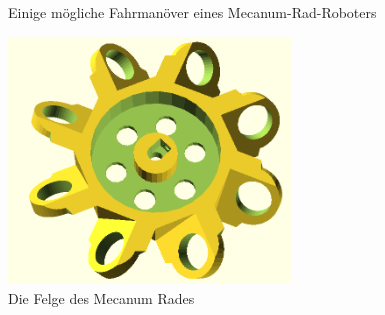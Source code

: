 \documentclass[a4paper,bibtotoc,oneside]{scrbook}
\begin{document}
\begin{figure}
\caption{Einige mögliche Fahrmanöver eines Mecanum-Rad-Roboters}\label{fahrman}
\end{figure} 

\begin{figure}[htbp]
\centering
\includegraphics[width=75mm]{img/wheel.png}
\caption{Die Felge des Mecanum Rades}\label{rad}
\end{figure}
\end{document}
